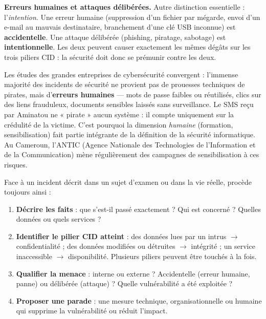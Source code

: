 \documentclass[11pt]{article}
\newcommand{\cle}[1]{{\popxbold\color{popdark}#1}}
\newcounter{popsec}
\newcounter{popsub}
\newcommand{\courssub}[1]{%
  \stepcounter{popsub}%
  \par\vspace{9pt}\noindent{\popxbold\fontsize{11.5}{13}\selectfont\color{popink}{\color{poporange}\thepopsec.\thepopsub}\hspace{6pt}#1}\par\nopagebreak\vspace{4pt}
}
\begin{document}
\textbf{Erreurs humaines et attaques délibérées.} Autre distinction essentielle : l'\emph{intention}. Une \cle{erreur humaine} (suppression d'un fichier par mégarde, envoi d'un e-mail au mauvais destinataire, branchement d'une clé USB inconnue) est \textbf{accidentelle}. Une \cle{attaque délibérée} (phishing, piratage, sabotage) est \textbf{intentionnelle}. Les deux peuvent causer exactement les mêmes dégâts sur les trois piliers CID : la sécurité doit donc se prémunir contre les deux.

\begin{savaistu}
Les études des grandes entreprises de cybersécurité convergent : l'immense majorité des incidents de sécurité ne provient pas de prouesses techniques de pirates, mais d'\textbf{erreurs humaines} — mots de passe faibles ou réutilisés, clics sur des liens frauduleux, documents sensibles laissés sans surveillance. Le SMS reçu par Aminatou ne « pirate » aucun système : il compte uniquement sur la crédulité de la victime. C'est pourquoi la dimension \emph{humaine} (formation, sensibilisation) fait partie intégrante de la définition de la sécurité informatique. Au Cameroun, l'ANTIC (Agence Nationale des Technologies de l'Information et de la Communication) mène régulièrement des campagnes de sensibilisation à ces risques.
\end{savaistu}

\courssub{Analyser un incident avec la triade CID}

\begin{methode}
Face à un incident décrit dans un sujet d'examen ou dans la vie réelle, procède toujours ainsi :
\begin{enumerate}
\item \textbf{Décrire les faits} : que s'est-il passé exactement ? Qui est concerné ? Quelles données ou quels services ?
\item \textbf{Identifier le pilier CID atteint} : des données lues par un intrus $\rightarrow$ confidentialité ; des données modifiées ou détruites $\rightarrow$ intégrité ; un service inaccessible $\rightarrow$ disponibilité. Plusieurs piliers peuvent être touchés à la fois.
\item \textbf{Qualifier la menace} : interne ou externe ? Accidentelle (erreur humaine, panne) ou délibérée (attaque) ? Quelle vulnérabilité a été exploitée ?
\item \textbf{Proposer une parade} : une mesure technique, organisationnelle ou humaine qui supprime la vulnérabilité ou réduit l'impact.
\end{enumerate}
\end{methode}
\end{document}
